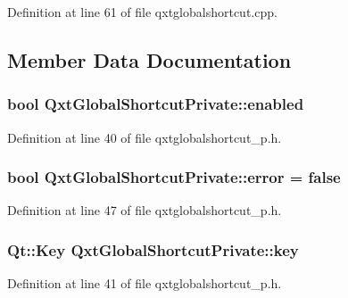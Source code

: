 Definition at line 61 of file qxtglobalshortcut.\-cpp.



\subsection{Member Data Documentation}
\hypertarget{class_qxt_global_shortcut_private_a1a1c744926f0825297e286a3808cfc52}{
\subsubsection[{enabled}]{\setlength{\rightskip}{0pt plus 5cm}bool Qxt\-Global\-Shortcut\-Private\-::enabled}}\label{class_qxt_global_shortcut_private_a1a1c744926f0825297e286a3808cfc52}


Definition at line 40 of file qxtglobalshortcut\-\_\-p.\-h.

\hypertarget{class_qxt_global_shortcut_private_ad0428909242656145314176d35cad1ff}{
\subsubsection[{error}]{\setlength{\rightskip}{0pt plus 5cm}bool Qxt\-Global\-Shortcut\-Private\-::error = false\hspace{0.3cm}{\ttfamily [static]}}}\label{class_qxt_global_shortcut_private_ad0428909242656145314176d35cad1ff}


Definition at line 47 of file qxtglobalshortcut\-\_\-p.\-h.

\hypertarget{class_qxt_global_shortcut_private_ab33624dd2ebefa854906fa3ab7298d99}{
\subsubsection[{key}]{\setlength{\rightskip}{0pt plus 5cm}Qt\-::\-Key Qxt\-Global\-Shortcut\-Private\-::key}}\label{class_qxt_global_shortcut_private_ab33624dd2ebefa854906fa3ab7298d99}


Definition at line 41 of file qxtglobalshortcut\-\_\-p.\-h.

